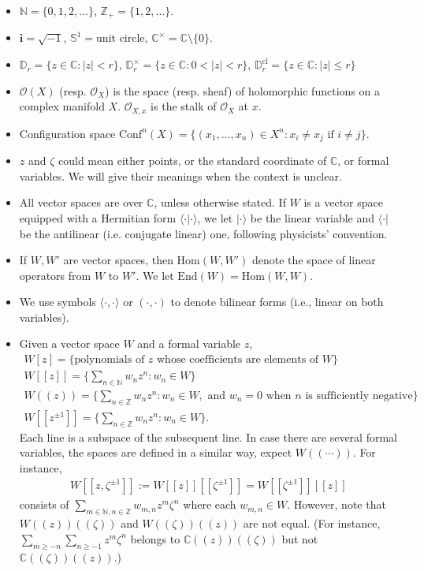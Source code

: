 \documentclass[12pt,a4paper,notitlepage]{article}
\theoremstyle{definition}
\theoremstyle{plain}
\newcommand{\End}{\mathrm{End}} %
\newcommand{\Hom}{\mathrm{Hom}}
\newcommand{\Conf}{\mathrm{Conf}}
\newcommand{\bk}[1]{\langle {#1}\rangle}
\newcommand{\scr}{\mathscr}
\newcommand{\im}{\mathbf{i}}
\newcommand{\mbb}{\mathbb}
\newcommand{\Cbb}{\mathbb C}
\newcommand{\Nbb}{\mathbb N}
\newcommand{\Zbb}{\mathbb Z}
\newcommand{\Dbb}{\mathbb D}
\newcommand{\Sbb}{{\mathbb S}}
\newcommand{\cl}{\mathrm{cl}}
\numberwithin{equation}{section}
\begin{document}
\begin{itemize}
\item $\Nbb=\{0,1,2,\dots\}$, $\Zbb_+=\{1,2,\dots\}$. 
\item $\im=\sqrt{-1}$, $\Sbb^1=$unit circle, $\Cbb^\times=\Cbb\setminus\{0\}$.
\item $\mbb D_r=\{z\in\Cbb:|z|<r\}$, $\mbb D_r^\times=\{z\in\Cbb:0<|z|<r\}$, $\Dbb_r^\cl=\{z\in\Cbb:|z|\leq r\}$
\item $\scr O(X)$ (resp. $\scr O_X$) is the space (resp. sheaf) of holomorphic functions on a complex manifold $X$. $\scr O_{X,x}$ is the stalk of $\scr O_X$ at $x$.
\item Configuration space $\Conf^n(X)=\{(x_1,\dots,x_n)\in X^n:x_i\neq x_j\text{ if }i\neq j\}$.
\item $z$ and $\zeta$ could mean either points, or the standard coordinate of $\Cbb$, or formal variables. We will give their meanings when the context is unclear. 
\item All vector spaces are over $\Cbb$, unless otherwise stated. If $W$ is a vector space equipped with a Hermitian form $\bk{\cdot|\cdot}$, we let $|\cdot\rangle$ be the linear variable and $\langle\cdot|$ be the antilinear (i.e. conjugate linear) one, following physicists' convention. 
\item If $W,W'$ are vector spaces, then $\Hom(W,W')$ denote the space of linear operators from $W$ to $W'$. We let $\End(W)=\Hom(W,W)$. 
\item We use symbols $\bk{\cdot,\cdot}$ or $(\cdot,\cdot)$ to denote bilinear forms (i.e., linear on both variables).
\item Given a vector space $W$ and a formal variable $z$,
\begin{subequations}
\begin{gather*}
W[z]=\{\text{polynomials of $z$ whose coefficients are elements of $W$}\}\\
W[[z]]=\Big\{\sum_{n\in\Nbb}w_nz^n:w_n\in W\Big\}\\
W((z))=\Big\{\sum_{n\in\Zbb}w_nz^n:w_n\in W,\text{ and }w_n=0\text{ when $n$ is sufficiently negative}\Big\}\\
W[[z^{\pm1}]]=\Big\{\sum_{n\in\Zbb}w_nz^n:w_n\in W\Big\}.
\end{gather*}
\end{subequations}
Each line is a subspace of the subsequent line. In case there are several formal variables, the spaces are defined in a similar way, expect $W((\cdots))$. For instance,
\begin{gather*}
W[[z,\zeta^{\pm1}]]:=W[[z]][[\zeta^{\pm1}]]=W[[\zeta^{\pm1}]][[z]]
\end{gather*}
consists of $\sum_{m\in\Nbb,n\in\Zbb}w_{m,n}z^m\zeta^n$ where each $w_{m,n}\in W$. However, note that $W((z))((\zeta))$ and $W((\zeta))((z))$ are not equal. (For instance, $\sum_{m\geq -n}\sum_{n\geq -1}z^m\zeta^n$ belongs to $\Cbb((z))((\zeta))$ but not $\Cbb((\zeta))((z))$.)


\end{itemize}
\end{document}
